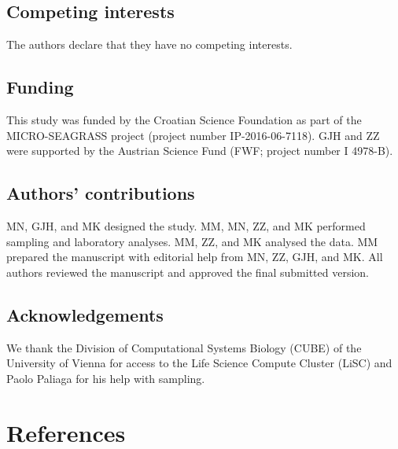 \documentclass[
  12 pt,
]{article}
\begin{document}
\hypertarget{competing-interests}{%
\subsection{Competing interests}\label{competing-interests}}

\noindent
The authors declare that they have no competing interests.

\hypertarget{funding}{%
\subsection{Funding}\label{funding}}

This study was funded by the Croatian Science Foundation as part of the MICRO-SEAGRASS project (project number IP-2016-06-7118). GJH and ZZ were supported by the Austrian Science Fund (FWF; project number I 4978-B).

\hypertarget{authors-contributions}{%
\subsection{Authors' contributions}\label{authors-contributions}}

MN, GJH, and MK designed the study. MM, MN, ZZ, and MK performed sampling and laboratory analyses. MM, ZZ, and MK analysed the data. MM prepared the manuscript with editorial help from MN, ZZ, GJH, and MK. All authors reviewed the manuscript and approved the final submitted version.

\hypertarget{acknowledgements}{%
\subsection{Acknowledgements}\label{acknowledgements}}

We thank the Division of Computational Systems Biology (CUBE) of the University of Vienna for access to the Life Science Compute Cluster (LiSC) and Paolo Paliaga for his help with sampling.

\newpage

\hypertarget{references}{%
\section{References}\label{references}}
\end{document}
